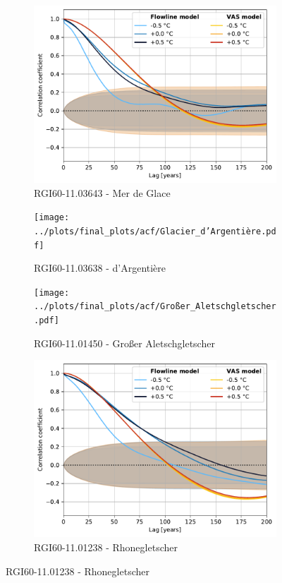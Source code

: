 \begin{figure}[htp]
        \begin{subfigure}[b]{0.48\textwidth}
          \caption{RGI60-11.03643 - Mer de Glace}
          \label{fig:acf:mer_de_glace}
          \centering
          \includegraphics[width=\textwidth]{../plots/final_plots/acf/Mer_de_Glace.pdf}
        \end{subfigure}
        \hfill
        \begin{subfigure}[b]{0.48\textwidth}
          \caption{RGI60-11.03638 - d'Argentière}
          \label{fig:acf:glacier_d_argentiere}
          \centering
          \texttt{[image: ../plots/final\_plots/acf/Glacier\_d'Argentière.pdf]}
        \end{subfigure}
        \begin{subfigure}[b]{0.48\textwidth}
          \caption{RGI60-11.01450 - Großer Aletschgletscher}
          \label{fig:acf:großer_aletschgletscher}
          \centering
          \texttt{[image: ../plots/final\_plots/acf/Großer\_Aletschgletscher.pdf]}
        \end{subfigure}
        \hfill
        \begin{subfigure}[b]{0.48\textwidth}
          \caption{RGI60-11.01238 - Rhonegletscher}
          \label{fig:acf:rhonegletscher}
          \centering
          \includegraphics[width=\textwidth]{../plots/final_plots/acf/Rhonegletscher.pdf}

\end{subfigure}
\end{figure}
